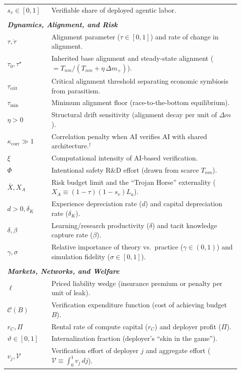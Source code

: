 \documentclass[12pt, letter]{article}
\begin{document}
\begin{longtable}{p{0.18\linewidth} p{0.77\linewidth}}
$s_v \in [0,1]$ & Verifiable share of deployed agentic labor. \\
\\
\multicolumn{2}{l}{\textbf{\textit{Dynamics, Alignment, and Risk}}} \\
$\tau, \dot{\tau}$ & Alignment parameter ($\tau \in [0,1]$) and rate of change in alignment. \\
$\tau_0, \tau^\star$ & Inherited base alignment and steady-state alignment ($= T_{nm}/(T_{nm}+\eta\,\Delta m_+)$). \\
$\tau_{\mathrm{crit}}$ & Critical alignment threshold separating economic symbiosis from parasitism. \\
$\tau_{\min}$ & Minimum alignment floor (race-to-the-bottom equilibrium). \\
$\eta > 0$ & Structural drift sensitivity (alignment decay per unit of $\Delta m$). \\
$\kappa_{\mathrm{corr}} \gg 1$ & Correlation penalty when AI verifies AI with shared architecture.$^\dagger$ \\
$\xi$ & Computational intensity of AI-based verification. \\
$\Phi$ & Intentional safety R\&D effort (drawn from scarce $T_{nm}$). \\
$\overline{X}, X_A$ & Risk budget limit and the ``Trojan Horse'' externality ($X_A \equiv (1-\tau)(1-s_v)L_a$). \\
$d > 0, \delta_K$ & Experience depreciation rate ($d$) and capital depreciation rate ($\delta_K$). \\
$\delta, \beta$ & Learning/research productivity ($\delta$) and tacit knowledge capture rate ($\beta$). \\
$\gamma, \sigma$ & Relative importance of theory vs.\ practice ($\gamma \in (0,1)$) and simulation fidelity ($\sigma \in [0,1]$). \\
\\
\multicolumn{2}{l}{\textbf{\textit{Markets, Networks, and Welfare}}} \\
$\ell$ & Priced liability wedge (insurance premium or penalty per unit of leak). \\
$\mathcal{C}(B)$ & Verification expenditure function (cost of achieving budget $B$). \\
$r_C, \Pi$ & Rental rate of compute capital ($r_C$) and deployer profit ($\Pi$). \\
$\vartheta \in [0,1]$ & Internalization fraction (deployer's ``skin in the game''). \\
$v_j, \mathcal{V}$ & Verification effort of deployer $j$ and aggregate effort ($\mathcal{V} \equiv \int_0^1 v_j\,dj$). \\

\end{longtable}
\end{document}

